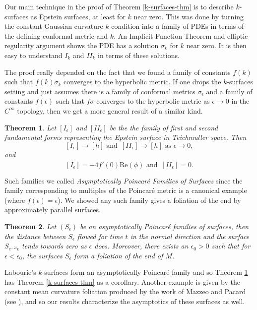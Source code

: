 \documentclass[11pt]{amsart}
\newtheorem{thm}{Theorem}[section]
\begin{document}
Our main technique in the proof of Theorem \ref{k-surfaces-thm} is to describe $k$-surfaces as Epstein surfaces, at least for $k$ near zero. This was done by turning the constant Gaussian curvature $k$ condition into a family of PDEs in terms of the defining conformal metric and $k$. An Implicit Function Theorem and elliptic regularity argument shows the PDE has a solution $\sigma_k$ for $k$ near zero. It is then easy to understand $I_k$ and $I\!I_k$ in terms of these solutions.

The proof really depended on the fact that we found a family of constants $f(k)$ such that $f(k)\sigma_k$ converges to the hyperbolic metric. If one drops the $k$-surfaces setting and just assumes there is a family of conformal metrics $\sigma_\epsilon$ and a family of constants $f(\epsilon)$ such that $f\sigma$ converges to the hyperbolic metric as $\epsilon \to 0$ in the $C^\infty$ topology, then we get a more general result of a similar kind. 

\begin{thm}
\label{asym-poincare-thm}
Let $[I_\epsilon]$ and $[I\!I_\epsilon]$ be the the family of first and second fundamental forms representing the Epstein surface in Teichmuller space. Then
\[
[I_\epsilon] \to  [h]  \text{ and } \, [I\!I_\epsilon] \to [h]  \text{ as } \epsilon \to 0,
\]
and
\[
\dot{[I_\epsilon]} = -4 f'(0) \mathrm{Re}(\phi) \text{ and } \, \dot{[I\!I_\epsilon]} = 0. 
\]
\end{thm}

Such families we called \emph{Asymptotically Poincar\'e Families of Surfaces} since the family corresponding to multiples of the Poincar\'e metric is a canonical example (where $f(\epsilon) = \epsilon$). We showed any such family gives a foliation of the end by approximately parallel surfaces.
\begin{thm}
Let $(S_\epsilon)$ be an asymptotically Poincar\'e families of surfaces, then the distance between $S_\epsilon$ flowed for time $t$ in the normal direction and the surface $S_{e^{-2t}\epsilon}$ tends towards zero as $\epsilon$ does.
Moreover, there exists an $\epsilon_0 > 0$ such that for $\epsilon < \epsilon_0$, the surfaces $S_\epsilon$ form a foliation of the end of $M$.
\end{thm}


Labourie's $k$-surfaces form an asymptotically Poincar\'e family and so Theorem \ref{asym-poincare-thm} has Theorem \ref{k-surfaces-thm} as a corollary. Another example is given by the constant mean curvature foliation produced by the work of Mazzeo and Pacard (see \cite{mazzeo-pacard2011}), and so our results characterize the asymptotics of these surfaces as well.
 
\end{document}
